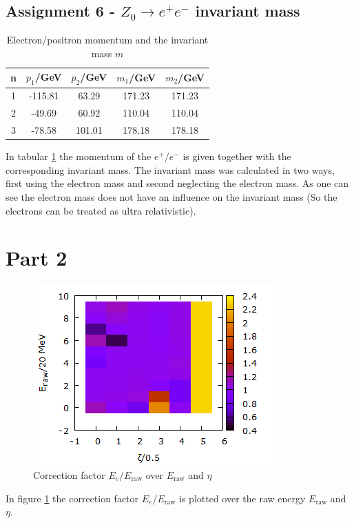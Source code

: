 \subsection{Assignment 6 - $Z_0 \to e^+ e^-$ invariant mass}
\begin{table}
\centering
\caption{Electron/positron momentum and the invariant mass $m$}
\begin{tabular}{ccccc}
\toprule
n & $p_1$/GeV & $p_2$/GeV & $m_1$/GeV & $m_2$/GeV\\
\midrule
1 &	-115.81&	63.29 & 171.23 & 171.23\\ 
2&	-49.69&	60.92 & 110.04 & 110.04\\
3&	-78.58&	101.01& 178.18 & 178.18\\
\bottomrule
\end{tabular}
\label{tab:task1_zee}
\end{table}

In tabular \ref{tab:task1_zee} the momentum of the $e^+/e^-$ is given together with the corresponding invariant mass. The invariant mass was calculated in two ways, first using the electron mass and second neglecting the electron mass. As one can see the electron mass does not have an influence on the invariant mass (So the electrons can be treated as ultra relativistic). 

\section{Part 2}
\begin{figure}
\centering
\includegraphics[scale=1]{data/zee_init/zee_init.png}
\caption{Correction factor $E_e/E_{\mathrm{raw}}$ over $E_{\mathrm{raw}}$ and $\eta$}
\label{fig:part2_factor}
\end{figure}

In figure \ref{fig:part2_factor} the correction factor $E_e/E_{\mathrm{raw}}$ is plotted over the raw energy $E_{\mathrm{raw}}$ and $\eta$. 

